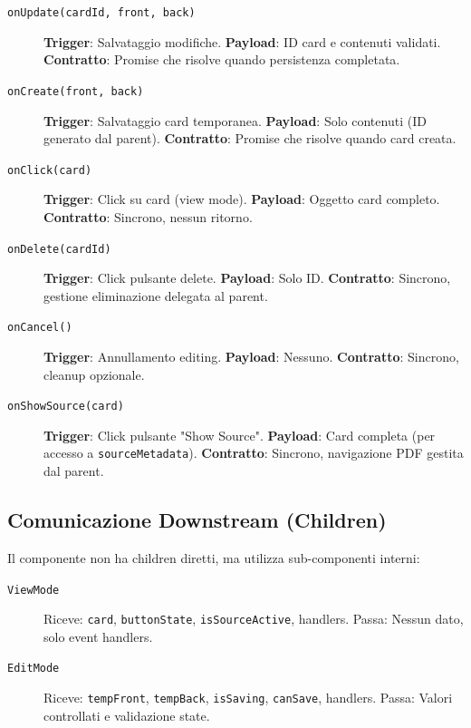 \documentclass[11pt,a4paper]{article}
\begin{document}
\begin{description}
    \item[\texttt{onUpdate(cardId, front, back)}] \textbf{Trigger}: Salvataggio modifiche. \textbf{Payload}: ID card e contenuti validati. \textbf{Contratto}: Promise che risolve quando persistenza completata.
    
    \item[\texttt{onCreate(front, back)}] \textbf{Trigger}: Salvataggio card temporanea. \textbf{Payload}: Solo contenuti (ID generato dal parent). \textbf{Contratto}: Promise che risolve quando card creata.
    
    \item[\texttt{onClick(card)}] \textbf{Trigger}: Click su card (view mode). \textbf{Payload}: Oggetto card completo. \textbf{Contratto}: Sincrono, nessun ritorno.
    
    \item[\texttt{onDelete(cardId)}] \textbf{Trigger}: Click pulsante delete. \textbf{Payload}: Solo ID. \textbf{Contratto}: Sincrono, gestione eliminazione delegata al parent.
    
    \item[\texttt{onCancel()}] \textbf{Trigger}: Annullamento editing. \textbf{Payload}: Nessuno. \textbf{Contratto}: Sincrono, cleanup opzionale.
    
    \item[\texttt{onShowSource(card)}] \textbf{Trigger}: Click pulsante "Show Source". \textbf{Payload}: Card completa (per accesso a \texttt{sourceMetadata}). \textbf{Contratto}: Sincrono, navigazione PDF gestita dal parent.
\end{description}

\subsection{Comunicazione Downstream (Children)}

Il componente non ha children diretti, ma utilizza sub-componenti interni:

\begin{description}
    \item[\texttt{ViewMode}] Riceve: \texttt{card}, \texttt{buttonState}, \texttt{isSourceActive}, handlers. Passa: Nessun dato, solo event handlers.
    
    \item[\texttt{EditMode}] Riceve: \texttt{tempFront}, \texttt{tempBack}, \texttt{isSaving}, \texttt{canSave}, handlers. Passa: Valori controllati e validazione state.
\end{description}
\end{document}
